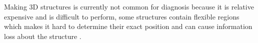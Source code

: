 Making 3D structures is currently not common for diagnosis because it is relative expensive and is difficult to perform, some structures contain flexible regions which makes it hard to determine their exact position and can cause information loss about the structure \cite{pdb101_pdb101:_nodate, ridgen_protein_nodate}.
\label{subsec:GD_Addition_of_structural_data}
\newpage


%
%

